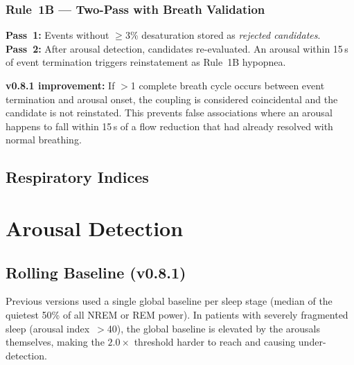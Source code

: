 \documentclass[11pt,a4paper,twocolumn]{article}
\begin{document}
\subsubsection{Rule~1B --- Two-Pass with Breath Validation}
\textbf{Pass~1:} Events without $\geq$3\% desaturation stored as \emph{rejected candidates}. \textbf{Pass~2:} After arousal detection, candidates re-evaluated. An arousal within 15\,s of event termination triggers reinstatement as Rule~1B hypopnea.

\textbf{v0.8.1 improvement:} If $>$1 complete breath cycle occurs between event termination and arousal onset, the coupling is considered coincidental and the candidate is not reinstated. This prevents false associations where an arousal happens to fall within 15\,s of a flow reduction that had already resolved with normal breathing.

\subsection{Respiratory Indices}

\begin{table}[H]
\centering\small
\caption{Indices (artifact-corrected TST)}
\end{table}


\section{Arousal Detection}

\subsection{Rolling Baseline (v0.8.1)}

Previous versions used a single global baseline per sleep stage (median of the quietest 50\% of all NREM or REM power). In patients with severely fragmented sleep (arousal index~$>$40), the global baseline is elevated by the arousals themselves, making the $2.0\times$ threshold harder to reach and causing under-detection.
\end{document}
